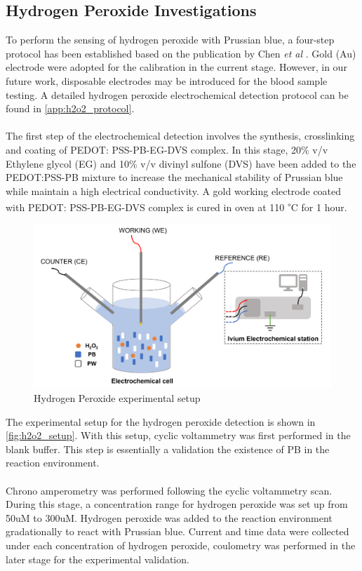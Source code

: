 \subsection{Hydrogen Peroxide Investigations}
To perform the sensing of hydrogen peroxide with Prussian blue, a four-step protocol has been established based on the publication by Chen \textit{et al} \cite{C9AN02438G}. Gold (Au) electrode were adopted for the calibration in the current stage. However, in our future work, disposable electrodes may be introduced for the blood sample testing. A detailed hydrogen peroxide electrochemical detection protocol can be found in \autoref{app:h2o2_protocol}. \\\\
The first step of the electrochemical detection involves the synthesis, crosslinking and coating of PEDOT: PSS-PB-EG-DVS complex. In this stage, 20\% v/v Ethylene glycol (EG) and 10\% v/v divinyl sulfone (DVS) have been added to the PEDOT:PSS-PB mixture to increase the mechanical stability of Prussian blue while maintain a high electrical conductivity. A gold working electrode coated with PEDOT: PSS-PB-EG-DVS complex is cured in oven at 110 \textsuperscript{$\circ$}C for 1 hour.
\begin{figure}[H]
    \centering
    \includegraphics[width=.5\textwidth]{img/h2o2_setup.png}
    \caption{Hydrogen Peroxide experimental setup}
    \label{fig:h2o2_setup}
\end{figure}
\noindent The experimental setup for the hydrogen peroxide detection is shown in \autoref{fig:h2o2_setup}. With this setup, cyclic voltammetry was first performed in the blank buffer. This step is essentially a validation the existence of PB in the reaction environment. \\\\
\noindent Chrono amperometry was performed following the cyclic voltammetry scan. During this stage, a concentration range for hydrogen peroxide was set up from 50uM to 300uM. Hydrogen peroxide was added to the reaction environment gradationally to react with Prussian blue. Current and time data were collected under each concentration of hydrogen peroxide, coulometry was performed in the later stage for the experimental validation.


